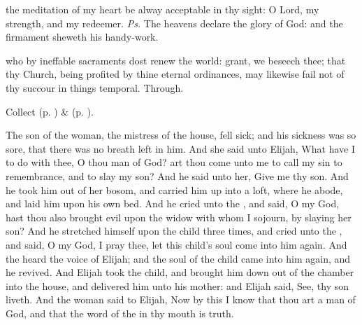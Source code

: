 \introit
{} the meditation of my heart be alway acceptable in thy sight: O Lord, my strength, and my redeemer. \textit{Ps.} The heavens declare the glory of God: and the firmament sheweth his handy-work.

\collect
{} who by ineffable sacraments dost renew the world: grant, we beseech thee; that thy Church, being profited by thine eternal ordinances, may likewise fail not of thy succour in things temporal. Through.
\begin{rubric}
     Collect  (p. \pageref{AshWednesdayMassCollect}) \&   (p. \pageref{SPLivingDeparted}).
\end{rubric}

 The son of the woman, the mistress of the house, fell sick; and his sickness was so sore, that there was no breath left in him. And she said unto Elijah, What have I to do with thee, O thou man of God? art thou come unto me to call my sin to remembrance, and to slay my son? And he said unto her, Give me thy son. And he took him out of her bosom, and carried him up into a loft, where he abode, and laid him upon his own bed. And he cried unto the , and said, O  my God, hast thou also brought evil upon the widow with whom I sojourn, by slaying her son? And he stretched himself upon the child three times, and cried unto the , and said, O  my God, I pray thee, let this child's soul come into him again. And the  heard the voice of Elijah; and the soul of the child came into him again, and he revived. And Elijah took the child, and brought him down out of the chamber into the house, and delivered him unto his mother: and Elijah said, See, thy son liveth. And the woman said to Elijah, Now by this I know that thou art a man of God, and that the word of the  in thy mouth is truth.


